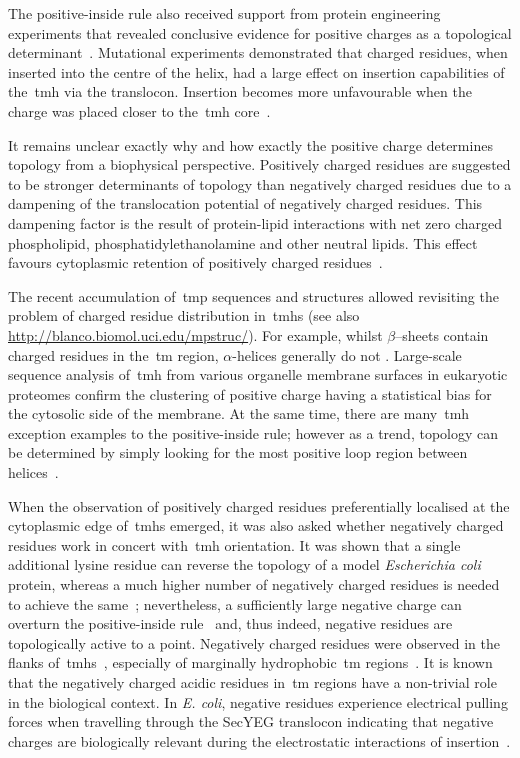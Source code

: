 The positive-inside rule also received support from protein engineering experiments that revealed conclusive evidence for positive charges as a topological determinant~\cite{VonHeijne1989, Beltzer1991, Kida2006, Nilsson1990}.
Mutational experiments demonstrated that charged residues, when inserted into the centre of the helix, had a large effect on insertion capabilities of the~\gls{tmh} via the translocon.
Insertion becomes more unfavourable when the charge was placed closer to the~\gls{tmh} core~\cite{Hessa2005}.

It remains unclear exactly why and how exactly the positive charge determines topology from a biophysical perspective.
Positively charged residues are suggested to be stronger determinants of topology than negatively charged residues due to a dampening of the translocation potential of negatively charged residues.
This dampening factor is the result of protein-lipid interactions with net zero charged phospholipid, phosphatidylethanolamine and other neutral lipids.
This effect favours cytoplasmic retention of positively charged residues~\cite{Bogdanov2014}.

The recent accumulation of~\gls{tmp} sequences and structures allowed revisiting the problem of charged residue distribution in~\gls{tmh}s (see also \url{http://blanco.biomol.uci.edu/mpstruc/}).
For example, whilst \(\beta\)--sheets contain charged residues in the~\gls{tm} region, $\alpha$\--helices generally do not \cite{Ulmschneider2001}.
Large-scale sequence analysis of~\gls{tmh} from various organelle membrane surfaces in eukaryotic proteomes confirm the clustering of positive charge having a statistical bias for the cytosolic side of the membrane.
At the same time, there are many~\gls{tmh} exception examples to the positive-inside rule; however as a trend, topology can be determined by simply looking for the most positive loop region between helices~\cite{Sharpe2010, Baeza-Delgado2013}.

When the observation of positively charged residues preferentially localised at the cytoplasmic edge of~\gls{tmh}s emerged, it was also asked whether negatively charged residues work in concert with~\gls{tmh} orientation.
It was shown that a single additional lysine residue can reverse the topology of a model \textit{Escherichia coli} protein, whereas a much higher number of negatively charged residues is needed to achieve the same~\cite{Nilsson1990}; nevertheless, a sufficiently large negative charge can overturn the positive-inside rule~\cite{Andersson1993, Kim1994} and, thus indeed, negative residues are topologically active to a point.
Negatively charged residues were observed in the flanks of~\gls{tmh}s~\cite{Baeza-Delgado2013}, especially of marginally hydrophobic~\gls{tm} regions~\cite{Delgado-Partin1998}.
It is known that the negatively charged acidic residues in~\gls{tm} regions have a non-trivial role in the biological context.
In \textit{E.
coli}, negative residues experience electrical pulling forces when travelling through the SecYEG translocon indicating that negative charges are biologically relevant during the electrostatic interactions of insertion~\cite{Ismail2012, Ismail2015}.

